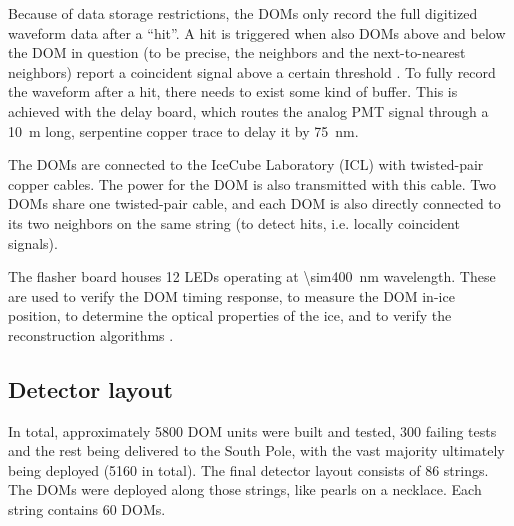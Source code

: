 \documentclass[
    a4paper, %
    fontsize=10pt, %
    twoside=true, %
    numbers=noenddot, %
    fontmethod=tex, %
]{kaobook}
\begin{document}
Because of data storage restrictions, the DOMs only record the full digitized waveform data after a ``hit''. A hit is triggered when also DOMs above and below the DOM in question (to be precise, the neighbors and the next-to-nearest neighbors) report a coincident signal above a certain threshold \cite{Aartsen2017}. To fully record the waveform after a hit, there needs to exist some kind of buffer. This is achieved with the delay board, which routes the analog PMT signal through a \SI{10}{\m} long, serpentine copper trace to delay it by \SI{75}{\nm}.

The DOMs are connected to the IceCube Laboratory (ICL) with twisted-pair copper cables. The power for the DOM is also transmitted with this cable. Two DOMs share one twisted-pair cable, and each DOM is also directly connected to its two neighbors on the same string (to detect hits, i.e. locally coincident signals).

The flasher board houses 12 LEDs operating at \SI{\sim400}{\nm} wavelength. These are used to verify the DOM timing response, to measure the DOM in-ice position, to determine the optical properties of the ice, and to verify the reconstruction algorithms \cite{Aartsen2017}.

\subsection*{Detector layout}
In total, approximately 5800 DOM units were built and tested, 300 failing tests and the rest being delivered to the South Pole, with the vast majority ultimately being deployed (5160 in total). The final detector layout consists of 86 strings. The DOMs were deployed along those strings, like pearls on a necklace. Each string contains 60 DOMs.
\end{document}

